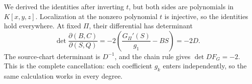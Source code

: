We derived the identities after inverting $t$, but both sides are polynomials
in $K[x,y,z]$.  Localization at the nonzero polynomial $t$ is injective, so
the identities hold everywhere.  At fixed $\Pi$, their differential has
determinant
\[
 \det\frac{\partial(B,C)}{\partial(S,Q)}
 =-2\left(\frac{G_\Pi'(S)}{g_1}-BS\right)=-2D.
\]
The source-chart determinant is $D^{-1}$, and the chain rule gives
$\det DF_G=-2$.  This is the complete cancellation: each coefficient $g_k$
enters independently, so the same calculation works in every degree.
